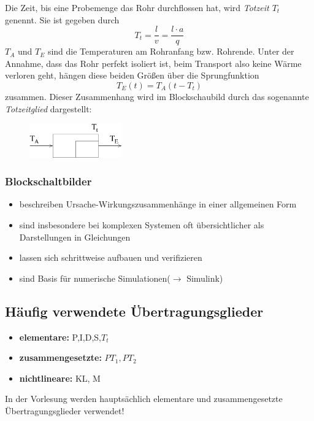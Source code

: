 \documentclass[12pt,a4paper,ngerman]{scrartcl}
\begin{document}
Die Zeit, bis eine Probemenge das Rohr durchflossen hat, wird \emph{Totzeit $T_t$} genennt. Sie ist gegeben durch
\begin{equation*}
  T_t=\frac{l}{v}=\frac{l \cdot a}{q}
\end{equation*}
$T_A$ und $T_E$ sind die Temperaturen am Rohranfang bzw. Rohrende. Unter der Annahme, dass das Rohr perfekt isoliert ist, beim Transport also keine Wärme verloren geht, hängen diese beiden Größen über die Sprungfunktion
\begin{equation*}
  T_E(t)=T_A(t-T_t)
\end{equation*}
zusammen. Dieser Zusammenhang wird im Blockschaubild durch das sogenannte \emph{Totzeitglied} dargestellt:
\begin{figure}[H]
  \includegraphics[width=4cm]{sysregel_tglied}
\end{figure}
\fancyhead{}
\fancyhead[LO,LE]{\leftmark}
\subsubsection*{Blockschaltbilder}
\begin{itemize}
\item beschreiben Ursache-Wirkungszusammenhänge in einer allgemeinen Form
\item sind insbesondere bei komplexen Systemen oft übersichtlicher als Darstellungen in Gleichungen
\item lassen sich schrittweise aufbauen und verifizieren
\item sind Basis für numerische Simulationen($\rightarrow$ Simulink)
\end{itemize}

\subsection{Häufig verwendete Übertragungsglieder}

\begin{itemize}
\item \textbf{elementare: }P,I,D,S,$T_t$
\item \textbf{zusammengesetzte: } $PT_1, PT_2$
\item \textbf{nichtlineare: } KL, M
\end{itemize}
In der Vorlesung werden hauptsächlich elementare und zusammengesetzte Übertragungsglieder verwendet!
\end{document}
